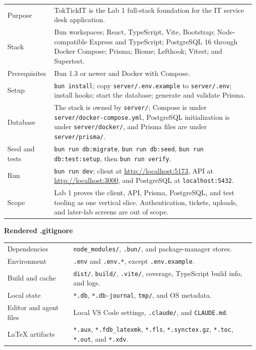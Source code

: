 \documentclass[10pt,a4paper]{article}
\begin{document}
\begin{tabular}{@{}p{31mm}p{129mm}@{}}
  Purpose & TokTickIT is the Lab 1 full-stack foundation for the IT service desk application. \\
  Stack & Bun workspaces; React, TypeScript, Vite, Bootstrap; Node-compatible Express and TypeScript; PostgreSQL 16 through Docker Compose; Prisma; Biome; Lefthook; Vitest; and Supertest. \\
  Prerequisites & Bun 1.3 or newer and Docker with Compose. \\
  Setup & \texttt{bun install}; copy \texttt{server/.env.example} to \texttt{server/.env}; install hooks; start the database; generate and validate Prisma. \\
  Database & The stack is owned by \texttt{server/}; Compose is under \texttt{server/docker-compose.yml}, PostgreSQL initialization is under \texttt{server/docker/}, and Prisma files are under \texttt{server/prisma/}. \\
  Seed and tests & \texttt{bun run db:migrate}, \texttt{bun run db:seed}, \texttt{bun run db:test:setup}, then \texttt{bun run verify}. \\
  Run & \texttt{bun run dev}; client at \url{http://localhost:5173}, API at \url{http://localhost:3000}, and PostgreSQL at \texttt{localhost:5432}. \\
  Scope & Lab 1 proves the client, API, Prisma, PostgreSQL, and test tooling as one vertical slice. Authentication, tickets, uploads, and later-lab screens are out of scope. \\
\end{tabular}

\vspace{2mm}
\textbf{Rendered .gitignore}

\begin{tabular}{@{}p{38mm}p{122mm}@{}}
  Dependencies & \texttt{node\_modules/}, \texttt{.bun/}, and package-manager stores. \\
  Environment & \texttt{.env} and \texttt{.env.*}, except \texttt{.env.example}. \\
  Build and cache & \texttt{dist/}, \texttt{build/}, \texttt{.vite/}, coverage, TypeScript build info, and logs. \\
  Local state & \texttt{*.db}, \texttt{*.db-journal}, \texttt{tmp/}, and OS metadata. \\
  Editor and agent files & Local VS Code settings, \texttt{.claude/}, and \texttt{CLAUDE.md}. \\
  LaTeX artifacts & \texttt{*.aux}, \texttt{*.fdb\_latexmk}, \texttt{*.fls}, \texttt{*.synctex.gz}, \texttt{*.toc}, \texttt{*.out}, and \texttt{*.xdv}. \\
\end{tabular}
\end{document}

